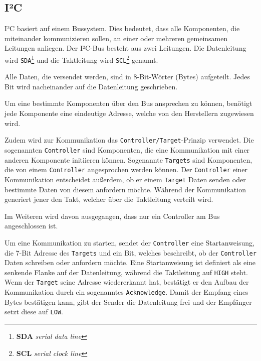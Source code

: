 \subsection{I²C}


I²C basiert auf einem Bussystem.
Dies bedeutet, dass alle Komponenten, die miteinander kommunizieren sollen, an einer oder mehreren gemeinsamen Leitungen anliegen.
Der I²C-Bus besteht aus zwei Leitungen.
Die Datenleitung wird \texttt{SDA}\footnote{\textbf{SDA} \textit{serial data line}} und die Taktleitung wird \texttt{SCL}\footnote{\textbf{SCL} \textit{serial clock line}} genannt.

Alle Daten, die versendet werden, sind in 8-Bit-Wörter (Bytes) aufgeteilt.
Jedes Bit wird nacheinander auf die Datenleitung geschrieben.

Um eine bestimmte Komponenten über den Bus ansprechen zu können, benötigt jede Komponente eine eindeutige Adresse, welche von den Herstellern zugewiesen wird.

Zudem wird zur Kommunikation das \texttt{Controller/Target}-Prinzip verwendet.
Die sogenannten \texttt{Controller} sind Komponenten, die eine Kommunikation mit einer anderen Komponente initiieren können.
Sogenannte \texttt{Targets} sind Komponenten, die von einem \texttt{Controller} angesprochen werden können.
Der \texttt{Controller} einer Kommunikation entscheidet außerdem, ob er einem \texttt{Target} Daten senden oder bestimmte Daten von diesem anfordern möchte.
Während der Kommunikation generiert jener den Takt, welcher über die Taktleitung verteilt wird.

Im Weiteren wird davon ausgegangen, dass nur ein Controller am Bus angeschlossen ist.

Um eine Kommunikation zu starten, sendet der \texttt{Controller} eine Startanweisung, die 7-Bit Adresse des \texttt{Targets} und ein Bit, welches beschreibt, ob der \texttt{Controller} Daten schreiben oder anfordern möchte.
Eine Startanweisung ist definiert als eine senkende Flanke auf der Datenleitung, während die Taktleitung auf \texttt{HIGH} steht.
Wenn der \texttt{Target} seine Adresse wiedererkannt hat, bestätigt er den Aufbau der Kommunikation durch ein sogenanntes \texttt{Acknowledge}.
Damit der Empfang eines Bytes bestätigen kann, gibt der Sender die Datenleitung frei und der Empfänger setzt diese auf \texttt{LOW}.
